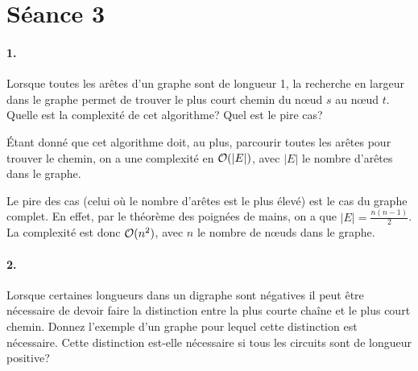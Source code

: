 %
%

\section{Séance 3}


\paragraph{1. } Lorsque toutes les arêtes d'un graphe sont de longueur 1, la recherche en largeur dans le graphe permet de trouver le plus court chemin du nœud $s$ au nœud $t$. Quelle est la complexité de cet algorithme? Quel est le pire cas?

\begin{solution}
  Étant donné que cet algorithme doit, au plus, parcourir toutes les arêtes pour trouver le chemin,
  on a une complexité en $\mathcal{O}(\vert E \vert)$, avec $\vert E \vert$ le nombre d'arêtes dans le graphe.

  Le pire des cas (celui où le nombre d'arêtes est le plus élevé) est le cas du graphe complet.
  En effet, par le théorème des poignées de mains, on a que $\vert E \vert = \frac{n(n-1)}{2}$.
  La complexité est donc $\mathcal{O}(n^2)$, avec $n$ le nombre de nœuds dans le graphe.
\end{solution}

\paragraph{2. } Lorsque certaines longueurs dans un digraphe sont négatives il peut être nécessaire de devoir faire la distinction entre la plus courte chaîne et le plus court chemin. Donnez l'exemple d'un graphe pour lequel cette distinction est nécessaire. Cette distinction est-elle nécessaire si tous les circuits sont de longueur positive?


